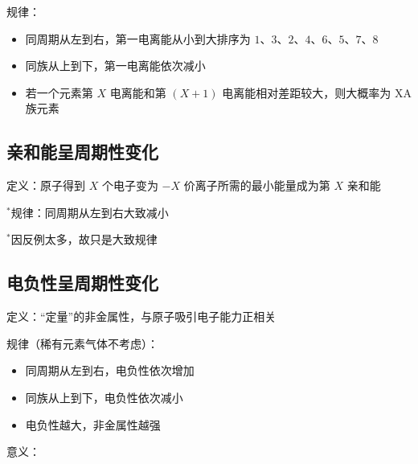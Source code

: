 \documentclass[UTF8,zihao=-4,openany]{ctexbook}
\begin{document}
规律：\par

\begin{itemize}
\item 同周期从左到右，第一电离能从小到大排序为 $1\mbox{、}3\mbox{、}2\mbox{、}4\mbox{、}6\mbox{、}5\mbox{、}7\mbox{、}8$
\end{itemize}

\begin{itemize}
\item 同族从上到下，第一电离能依次减小
\end{itemize}

\begin{itemize}
\item 若一个元素第 $X$ 电离能和第 $(X+1)$ 电离能相对差距较大，则大概率为 XA 族元素
\end{itemize}

\subsection{亲和能呈周期性变化}
定义：原子得到 $X$ 个电子变为 $-X$ 价离子所需的最小能量成为第 $X$ 亲和能\par

$^*$规律：同周期从左到右大致减小\par

$^*$因反例太多，故只是大致规律\par
\subsection{电负性呈周期性变化}
定义：“定量”的非金属性，与原子吸引电子能力正相关\par

规律（稀有元素气体不考虑）：\par

\begin{itemize}
\item 同周期从左到右，电负性依次增加
\end{itemize}

\begin{itemize}
\item 同族从上到下，电负性依次减小
\end{itemize}

\begin{itemize}
\item 电负性越大，非金属性越强
\end{itemize}

意义：\par
\end{document}

